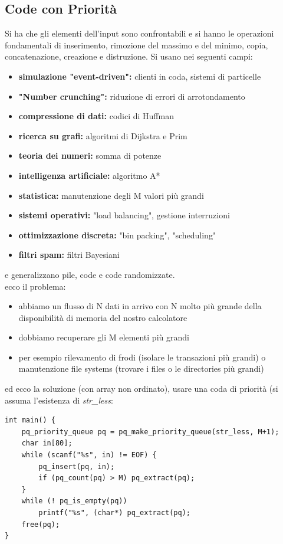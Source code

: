 \documentclass[a4paper,12pt, oneside]{book}
\begin{document}
\subsection{Code con Priorità}
Si ha che gli elementi dell'input sono confrontabili e si hanno le operazioni fondamentali di inserimento, rimozione del massimo e del minimo, copia, concatenazione, creazione e distruzione. Si usano nei seguenti campi:
\begin{itemize}
\item \textbf{simulazione "event-driven":} clienti in coda, sistemi di particelle
\item \textbf{"Number crunching":} riduzione di errori di arrotondamento
\item \textbf{compressione di dati:} codici di Huffman
\item \textbf{ricerca su grafi:} algoritmi di Dijkstra e Prim
\item \textbf{teoria dei numeri:} somma di potenze
\item \textbf{intelligenza artificiale:} algoritmo A*
\item \textbf{statistica:} manutenzione degli M valori più grandi
\item \textbf{sistemi operativi:} "load balancing", gestione interruzioni
\item \textbf{ottimizzazione discreta:} "bin packing", "scheduling"
\item \textbf{filtri spam:} filtri Bayesiani 
\end{itemize}
e generalizzano pile, code e code randomizzate.\\
ecco il problema:
\begin{itemize}
\item abbiamo un flusso di N dati in arrivo con N molto più grande della
disponibilità di memoria del nostro calcolatore
\item dobbiamo recuperare gli M elementi più grandi
\item per esempio rilevamento di frodi (isolare le transazioni più grandi) o manutenzione file systems (trovare i files o le directories più grandi)
\end{itemize}
ed ecco la soluzione (con array non ordinato), usare una coda di priorità (si assuma l'esistenza di \textit{str\_less}:
\begin{verbatim}
int main() {
    pq_priority_queue pq = pq_make_priority_queue(str_less, M+1);
    char in[80];
    while (scanf("%s", in) != EOF) {
        pq_insert(pq, in);
        if (pq_count(pq) > M) pq_extract(pq);
    }
    while (! pq_is_empty(pq))
        printf("%s", (char*) pq_extract(pq);
    free(pq);
}
\end{verbatim}
\end{document}
